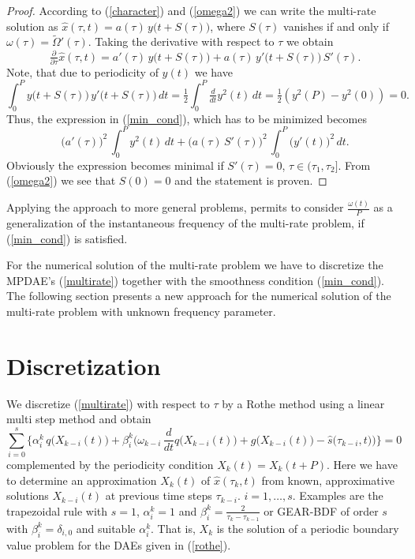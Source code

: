 \documentclass{siamltex}
\begin{document}
\begin{proof}
According to (\ref{character}) and (\ref{omega2}) we can write the multi-rate solution as 
$\hat{x}(\tau,t) = a(\tau)\,y\big(t+S(\tau)\big)$, where $S(\tau)$ vanishes if and only if 
$\omega(\tau)=\tilde{\Omega}'(\tau)$. Taking the derivative with respect to $\tau$ we obtain
$$
\tfrac{\partial}{\partial\tau}\hat{x}(\tau,t)
=a'(\tau)\,y\big(t+S(\tau)\big)+a(\tau)\,y'\big(t+S(\tau)\big)\,S'(\tau).
$$ 
Note, that due to periodicity of $y(t)$ we have
$$
\int_0^P y\big(t+S(\tau)\big)\,y'\big(t+S(\tau)\big)\,dt 
= \tfrac{1}{2}\int_0^P \tfrac{d}{dt}y^2(t)\,dt
= \tfrac{1}{2}\left(y^2(P)-y^2(0)\right) = 0.
$$
Thus, the expression in (\ref{min_cond}), which has to be minimized becomes 
$$
 \big(a'(\tau)\big)^2\,\int_0^P y^2(t)\,dt
+\big(a(\tau)\,S'(\tau)\big)^2 \,\int_0^P \big(y'(t)\big)^2\,dt.
$$
Obviously the expression becomes minimal if $S'(\tau) = 0$, $\tau\in(\tau_1,\tau_2]$.
From (\ref{omega2}) we see that $S(0)=0$ and the statement is proven.
\end{proof}

Applying the approach to more general problems, permits to consider $\frac{\omega(t)}{P}$
as a generalization of the instantaneous frequency of the multi-rate problem, if (\ref{min_cond})
is satisfied. 

For the numerical solution of the multi-rate problem we have to discretize the MPDAE's (\ref{multirate})
together with the smoothness condition (\ref{min_cond}). The following section presents a new approach for the numerical solution of the multi-rate problem with unknown frequency parameter.

\section{Discretization\label{ROTHE}}

We discretize (\ref{multirate}) with respect to $\tau$ by a Rothe method using a linear multi step
method and obtain
\begin{equation}\label{rothe}
\sum_{i=0}^s \Bigg\{\alpha^k_i\, q\big(X_{k-i}(t)\big) + \beta^k_i
  \bigg(\omega_{k-i}\,\frac{d}{dt}q\big(X_{k-i}(t)\big)   
  + g\big(X_{k-i}(t)\big)-\hat{s}\big(\tau_{k-i},t\big)\bigg)\Bigg\}=0\quad
\end{equation}
complemented by the periodicity condition $X_k(t) = X_k(t+P)$.
Here we have to determine an approximation $X_k(t)$ of
$\hat{x}(\tau_k,t)$ from known, approximative solutions
$X_{k-i}(t)$ at previous time steps $\tau_{k-i}$. $i=1,\ldots,s$.
Examples are the trapezoidal rule with $s=1$, $\alpha^k_i = 1$ and
$\beta^k_i=\frac{2}{\tau_k-\tau_{k-1}}$ or GEAR-BDF of order $s$
with $\beta^k_i=\delta_{i,0}$ and suitable $\alpha^k_i$. That is,
$X_k$ is the solution of a periodic boundary value problem for the
DAEs given in (\ref{rothe}). 
\end{document}
